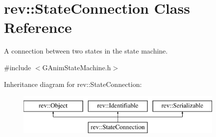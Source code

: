\hypertarget{classrev_1_1_state_connection}{}\section{rev\+::State\+Connection Class Reference}
\label{classrev_1_1_state_connection}


A connection between two states in the state machine.  




{\ttfamily \#include $<$G\+Anim\+State\+Machine.\+h$>$}

Inheritance diagram for rev\+::State\+Connection\+:\begin{figure}[H]
\begin{center}
\leavevmode
\includegraphics[height=2.000000cm]{classrev_1_1_state_connection}
\end{center}
\end{figure}
